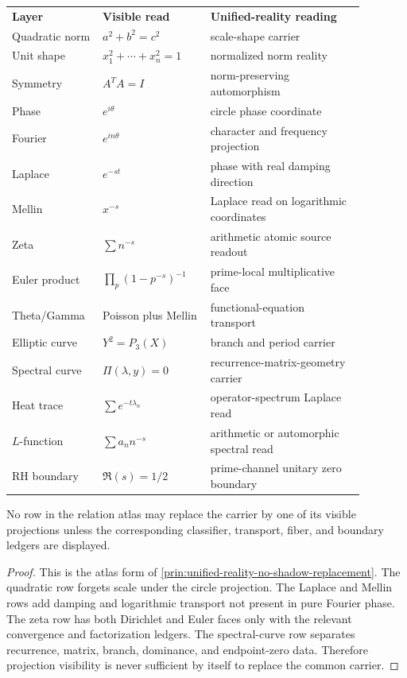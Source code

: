 \begin{center}
\begin{tabular}{p{0.20\linewidth}p{0.28\linewidth}p{0.40\linewidth}}
\textbf{Layer} & \textbf{Visible read} & \textbf{Unified-reality reading}\\
Quadratic norm & $a^2+b^2=c^2$ & scale-shape carrier\\
Unit shape & $x_1^2+\cdots+x_n^2=1$ & normalized norm reality\\
Symmetry & $A^TA=I$ & norm-preserving automorphism\\
Phase & $e^{i\theta}$ & circle phase coordinate\\
Fourier & $e^{in\theta}$ & character and frequency projection\\
Laplace & $e^{-st}$ & phase with real damping direction\\
Mellin & $x^{-s}$ & Laplace read on logarithmic coordinates\\
Zeta & $\sum n^{-s}$ & arithmetic atomic source readout\\
Euler product & $\prod_p(1-p^{-s})^{-1}$ & prime-local multiplicative face\\
Theta/Gamma & Poisson plus Mellin & functional-equation transport\\
Elliptic curve & $Y^2=P_3(X)$ & branch and period carrier\\
Spectral curve & $\Pi(\lambda,y)=0$ & recurrence-matrix-geometry carrier\\
Heat trace & $\sum e^{-t\lambda_n}$ & operator-spectrum Laplace read\\
$L$-function & $\sum a_n n^{-s}$ & arithmetic or automorphic spectral read\\
RH boundary & $\Re(s)=1/2$ & prime-channel unitary zero boundary
\end{tabular}
\end{center}

\begin{theorem}
\label{thm:unified-reality-relation-atlas-noncollapse}
No row in the relation atlas may replace the carrier by one of its
visible projections unless the corresponding classifier, transport,
fiber, and boundary ledgers are displayed.
\end{theorem}

\begin{proof}
This is the atlas form of
\autoref{prin:unified-reality-no-shadow-replacement}. The quadratic row
forgets scale under the circle projection. The Laplace and Mellin rows
add damping and logarithmic transport not present in pure Fourier phase.
The zeta row has both Dirichlet and Euler faces only with the relevant
convergence and factorization ledgers. The spectral-curve row separates
recurrence, matrix, branch, dominance, and endpoint-zero data. Therefore
projection visibility is never sufficient by itself to replace the
common carrier.
\end{proof}

